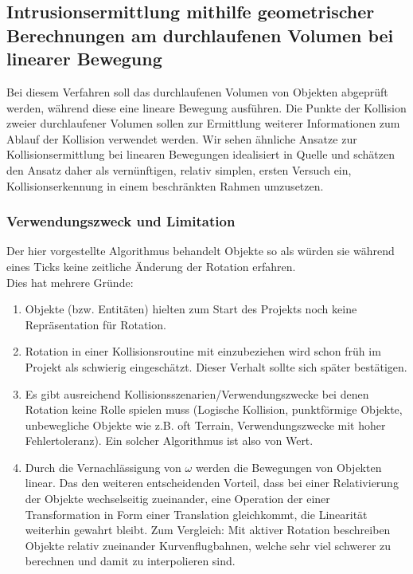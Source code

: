 \subsection{Intrusionsermittlung mithilfe geometrischer Berechnungen am durchlaufenen Volumen bei linearer Bewegung}
\label{sec:linear_int}
Bei diesem Verfahren soll das durchlaufenen Volumen von Objekten abgeprüft werden, während diese eine lineare Bewegung ausführen. Die Punkte der Kollision zweier durchlaufener Volumen sollen zur Ermittlung weiterer Informationen zum Ablauf der Kollision verwendet werden. Wir sehen ähnliche Ansatze zur Kollisionsermittlung bei linearen Bewegungen idealisiert in Quelle \cite[ch.12, p.361]{fourcrossfour} und schätzen den Ansatz daher als vernünftigen, relativ simplen, ersten Versuch ein, Kollisionserkennung in einem beschränkten Rahmen umzusetzen.
\subsubsection{Verwendungszweck und Limitation}
Der hier vorgestellte Algorithmus behandelt Objekte so als würden sie während eines Ticks keine zeitliche Änderung der Rotation erfahren.\\
Dies hat mehrere Gründe:
\begin{enumerate}
\item Objekte (bzw. Entitäten) hielten zum Start des Projekts noch keine Repräsentation für Rotation.
\item Rotation in einer Kollisionsroutine mit einzubeziehen wird schon früh im Projekt als schwierig eingeschätzt. Dieser Verhalt sollte sich später bestätigen.
\item Es gibt ausreichend Kollisionsszenarien/Verwendungszwecke bei denen Rotation keine Rolle spielen muss (Logische Kollision, punktförmige Objekte, unbewegliche Objekte wie z.B. oft Terrain, Verwendungszwecke mit hoher Fehlertoleranz). Ein solcher Algorithmus ist also von Wert.
\item Durch die Vernachlässigung von $\omega$ werden die Bewegungen von Objekten linear. Das den weiteren entscheidenden Vorteil, dass bei einer Relativierung der Objekte wechselseitig zueinander, eine Operation der einer Transformation in Form einer Translation gleichkommt, die Linearität weiterhin gewahrt bleibt. Zum Vergleich: Mit aktiver Rotation beschreiben Objekte relativ zueinander Kurvenflugbahnen, welche sehr viel schwerer zu berechnen und damit zu interpolieren sind.\\
\end{enumerate}

